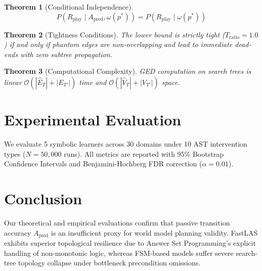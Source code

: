 \documentclass[journal]{IEEEtran}
\newtheorem{theorem}{Theorem}
\begin{document}
\begin{theorem}[Conditional Independence]
$$P(R_{\text{play}} \mid A_{\text{pred}}, \omega(p^*)) = P(R_{\text{play}} \mid \omega(p^*))$$
\end{theorem}

\begin{theorem}[Tightness Conditions]
The lower bound is strictly tight ($T_{\text{ratio}} = 1.0$) if and only if phantom edges are non-overlapping and lead to immediate dead-ends with zero subtree propagation.
\end{theorem}

\begin{theorem}[Computational Complexity]
GED computation on search trees is linear $\mathcal{O}(|\hat{E}_T| + |E_{T'}|)$ time and $\mathcal{O}(|\hat{V}_T| + |V_{T'}|)$ space.
\end{theorem}

\section{Experimental Evaluation}
We evaluate 5 symbolic learners across 30 domains under 10 AST intervention types ($N = 50,000$ runs). All metrics are reported with 95\% Bootstrap Confidence Intervals and Benjamini-Hochberg FDR correction ($\alpha = 0.01$).

\section{Conclusion}
Our theoretical and empirical evaluations confirm that passive transition accuracy $A_{\text{pred}}$ is an insufficient proxy for world model planning validity. FastLAS exhibits superior topological resilience due to Answer Set Programming's explicit handling of non-monotonic logic, whereas FSM-based models suffer severe search-tree topology collapse under bottleneck precondition omissions.
\end{document}
